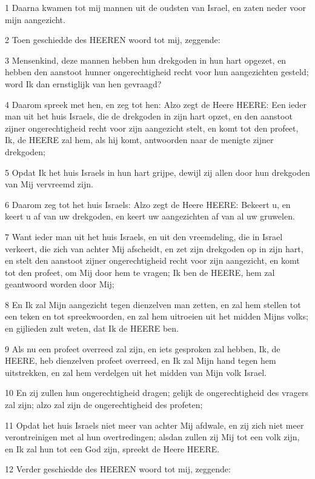 \par 1 Daarna kwamen tot mij mannen uit de oudsten van Israel, en zaten neder voor mijn aangezicht.
\par 2 Toen geschiedde des HEEREN woord tot mij, zeggende:
\par 3 Mensenkind, deze mannen hebben hun drekgoden in hun hart opgezet, en hebben den aanstoot hunner ongerechtigheid recht voor hun aangezichten gesteld; word Ik dan ernstiglijk van hen gevraagd?
\par 4 Daarom spreek met hen, en zeg tot hen: Alzo zegt de Heere HEERE: Een ieder man uit het huis Israels, die de drekgoden in zijn hart opzet, en den aanstoot zijner ongerechtigheid recht voor zijn aangezicht stelt, en komt tot den profeet, Ik, de HEERE zal hem, als hij komt, antwoorden naar de menigte zijner drekgoden;
\par 5 Opdat Ik het huis Israels in hun hart grijpe, dewijl zij allen door hun drekgoden van Mij vervreemd zijn.
\par 6 Daarom zeg tot het huis Israels: Alzo zegt de Heere HEERE: Bekeert u, en keert u af van uw drekgoden, en keert uw aangezichten af van al uw gruwelen.
\par 7 Want ieder man uit het huis Israels, en uit den vreemdeling, die in Israel verkeert, die zich van achter Mij afscheidt, en zet zijn drekgoden op in zijn hart, en stelt den aanstoot zijner ongerechtigheid recht voor zijn aangezicht, en komt tot den profeet, om Mij door hem te vragen; Ik ben de HEERE, hem zal geantwoord worden door Mij;
\par 8 En Ik zal Mijn aangezicht tegen dienzelven man zetten, en zal hem stellen tot een teken en tot spreekwoorden, en zal hem uitroeien uit het midden Mijns volks; en gijlieden zult weten, dat Ik de HEERE ben.
\par 9 Als nu een profeet overreed zal zijn, en iets gesproken zal hebben, Ik, de HEERE, heb dienzelven profeet overreed, en Ik zal Mijn hand tegen hem uitstrekken, en zal hem verdelgen uit het midden van Mijn volk Israel.
\par 10 En zij zullen hun ongerechtigheid dragen; gelijk de ongerechtigheid des vragers zal zijn; alzo zal zijn de ongerechtigheid des profeten;
\par 11 Opdat het huis Israels niet meer van achter Mij afdwale, en zij zich niet meer verontreinigen met al hun overtredingen; alsdan zullen zij Mij tot een volk zijn, en Ik zal hun tot een God zijn, spreekt de Heere HEERE.
\par 12 Verder geschiedde des HEEREN woord tot mij, zeggende:
